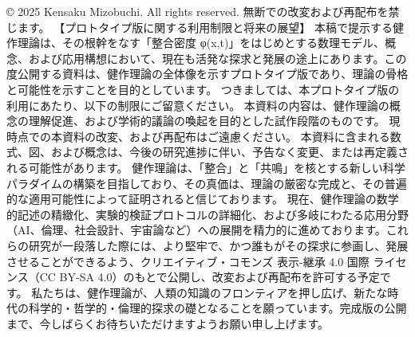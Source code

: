 \documentclass{article}
\begin{document}
© 2025 Kensaku Mizobuchi. All rights reserved. 無断での改変および再配布を禁じます。
【プロトタイプ版に関する利用制限と将来の展望】
本稿で提示する健作理論は、その根幹をなす「整合密度 φ(x,t)」をはじめとする数理モデル、概念、および応用構想において、現在も活発な探求と発展の途上にあります。この度公開する資料は、健作理論の全体像を示すプロトタイプ版であり、理論の骨格と可能性を示すことを目的としています。
つきましては、本プロトタイプ版の利用にあたり、以下の制限にご留意ください。
本資料の内容は、健作理論の概念の理解促進、および学術的議論の喚起を目的とした試作段階のものです。
現時点での本資料の改変、および再配布はご遠慮ください。
本資料に含まれる数式、図、および概念は、今後の研究進捗に伴い、予告なく変更、または再定義される可能性があります。
健作理論は、「整合」と「共鳴」を核とする新しい科学パラダイムの構築を目指しており、その真価は、理論の厳密な完成と、その普遍的な適用可能性によって証明されると信じております。
現在、健作理論の数学的記述の精緻化、実験的検証プロトコルの詳細化、および多岐にわたる応用分野（AI、倫理、社会設計、宇宙論など）への展開を精力的に進めております。これらの研究が一段落した際には、より堅牢で、かつ誰もがその探求に参画し、発展させることができるよう、クリエイティブ・コモンズ 表示-継承 4.0 国際 ライセンス（CC BY-SA 4.0）のもとで公開し、改変および再配布を許可する予定です。
私たちは、健作理論が、人類の知識のフロンティアを押し広げ、新たな時代の科学的・哲学的・倫理的探求の礎となることを願っています。完成版の公開まで、今しばらくお待ちいただけますようお願い申し上げます。
\end{document}
